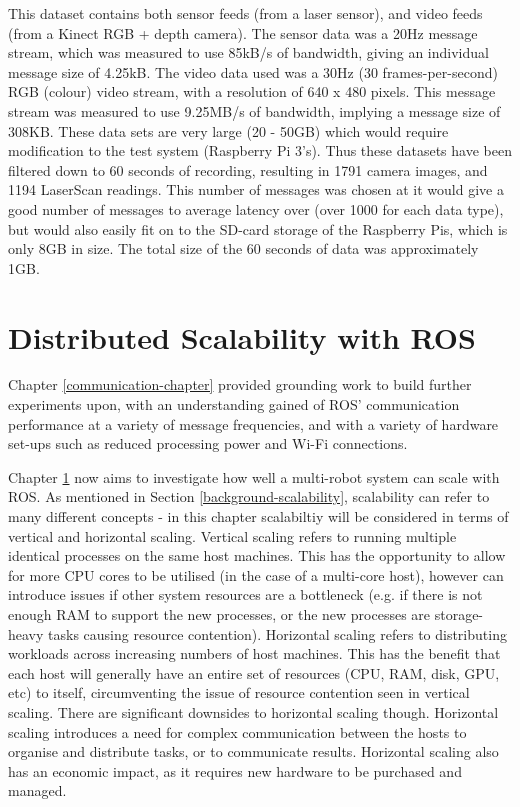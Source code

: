 \documentclass{l4proj}
\begin{document}
This dataset contains both sensor feeds (from a laser sensor), and video feeds (from a Kinect RGB + depth camera). The sensor data was a 20Hz message stream, which was measured to use 85kB/s of bandwidth, giving an individual message size of 4.25kB. The video data used was a 30Hz (30 frames-per-second) RGB (colour) video stream, with a resolution of 640 x 480 pixels. This message stream was measured to use 9.25MB/s of bandwidth, implying a message size of 308KB. These data sets are very large (20 - 50GB) which would require modification to the test system (Raspberry Pi 3’s). Thus these datasets have been filtered down to 60 seconds of recording, resulting in 1791 camera images, and 1194 LaserScan readings. This number of messages was chosen at it would give a good number of messages to average latency over (over 1000 for each data type), but would also easily fit on to the SD-card storage of the Raspberry Pis, which is only 8GB in size. The total size of the 60 seconds of data was approximately 1GB.





\chapter{Distributed Scalability with ROS}
\label{host-scalability-chapter}

Chapter \ref{communication-chapter} provided grounding work to build further experiments upon, with an understanding gained of ROS' communication performance at a variety of message frequencies, and with a variety of hardware set-ups such as reduced processing power and Wi-Fi connections.

Chapter \ref{host-scalability-chapter} now aims to investigate how well a multi-robot system can scale with ROS. As mentioned in Section \ref{background-scalability}, scalability can refer to many different concepts - in this chapter scalabiltiy will be considered in terms of vertical and horizontal scaling. Vertical scaling refers to running multiple identical processes on the same host machines. This has the opportunity to allow for more CPU cores to be utilised (in the case of a multi-core host), however can introduce issues if other system resources are a bottleneck (e.g. if there is not enough RAM to support the new processes, or the new processes are storage-heavy tasks causing resource contention). Horizontal scaling refers to distributing workloads across increasing numbers of host machines. This has the benefit that each host will generally have an entire set of resources (CPU, RAM, disk, GPU, etc) to itself, circumventing the issue of resource contention seen in vertical scaling. There are significant downsides to horizontal scaling though. Horizontal scaling introduces a need for complex communication between the hosts to organise and distribute tasks, or to communicate results. Horizontal scaling also has an economic impact, as it requires new hardware to be purchased and managed.
\end{document}
